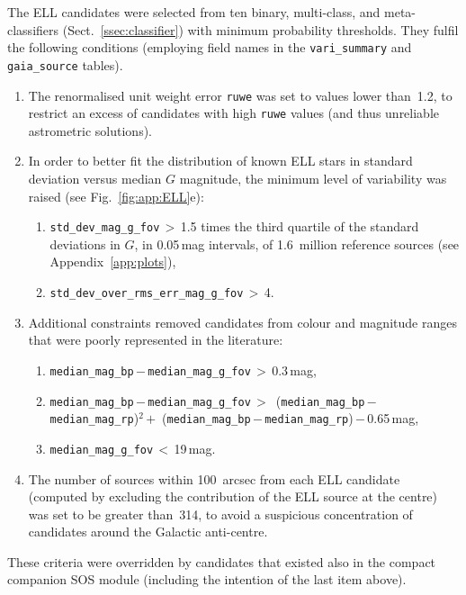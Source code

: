 \documentclass[longauth]{aa}
\def\g{$G$\xspace}
\begin{document}
The ELL candidates were selected from ten binary, multi-class, and meta-classifiers (Sect.~\ref{ssec:classifier}) with minimum probability thresholds. They fulfil the following conditions (employing field names in the \texttt{vari\_summary} and \texttt{gaia\_source} tables).
\begin{enumerate}
    \item The renormalised unit weight error \texttt{ruwe} was set to values lower than~1.2, to restrict an excess of candidates with high \texttt{ruwe} values (and thus unreliable astrometric solutions).
    \item In order to better fit the distribution of known ELL stars in standard deviation versus median \g magnitude, the minimum level of variability was raised (see Fig.~\ref{fig:app:ELL}e):
    \begin{enumerate}
        \item \texttt{std\_dev\_mag\_g\_fov}\,$>$\,1.5 times the third quartile of the standard deviations in \g, in 0.05\,mag intervals, of 1.6~million reference sources (see Appendix~\ref{app:plots}),
        \item \texttt{std\_dev\_over\_rms\_err\_mag\_g\_fov}\,$>$\,4.
    \end{enumerate}
    \item Additional constraints removed candidates from colour and magnitude ranges that were poorly represented in the literature:
    \begin{enumerate}
        \item \texttt{median\_mag\_bp}\,$-$\,\texttt{median\_mag\_g\_fov}\,$>$\,0.3\,mag,
        \item \texttt{median\_mag\_bp}\,$-$\,\texttt{median\_mag\_g\_fov}\,$>$ \,(\texttt{median\_mag\_bp}\,$-$\,\texttt{median\_mag\_rp})$^2$\,$+$ \,(\texttt{median\_mag\_bp}\,$-$\,\texttt{median\_mag\_rp})\,$-$\,0.65\,mag,
        \item \texttt{median\_mag\_g\_fov}\,$<$\,19\,mag.
    \end{enumerate}
    \item The number of sources within 100~arcsec from each ELL candidate (computed by excluding the contribution of the ELL source at the centre) was set to be greater than~314, to avoid a suspicious concentration of candidates around the Galactic anti-centre.
\end{enumerate}
These criteria were overridden by candidates that existed also in the compact companion SOS module (including the intention of the last item above).
\end{document}
